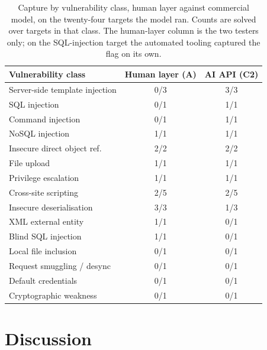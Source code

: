 \documentclass[conference]{IEEEtran}
\begin{document}
\begin{table}[!t]
\centering
\caption{Capture by vulnerability class, human layer against commercial model, on the twenty-four targets the model ran. Counts are solved over targets in that class. The human-layer column is the two testers only; on the SQL-injection target the automated tooling captured the flag on its own.}
\label{tab:class}
\begin{tabular}{@{}lcc@{}}
\toprule
Vulnerability class & Human layer (A) & AI API (C2) \\
\midrule
Server-side template injection & 0/3 & 3/3 \\
SQL injection                  & 0/1 & 1/1 \\
Command injection              & 0/1 & 1/1 \\
NoSQL injection                & 1/1 & 1/1 \\
Insecure direct object ref.    & 2/2 & 2/2 \\
File upload                    & 1/1 & 1/1 \\
Privilege escalation           & 1/1 & 1/1 \\
Cross-site scripting           & 2/5 & 2/5 \\
Insecure deserialisation       & 3/3 & 1/3 \\
XML external entity            & 1/1 & 0/1 \\
Blind SQL injection            & 1/1 & 0/1 \\
Local file inclusion           & 0/1 & 0/1 \\
Request smuggling / desync     & 0/1 & 0/1 \\
Default credentials            & 0/1 & 0/1 \\
Cryptographic weakness         & 0/1 & 0/1 \\
\bottomrule
\end{tabular}
\end{table}

\section{Discussion}
\end{document}
